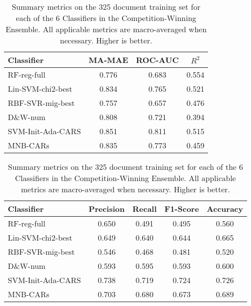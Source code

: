 \begin{table}[]
\centering
    \begin{tabular}{|l|c|c|c|}
        \hline
        \textsf{ Classifier } & \textsf{ MA-MAE } & \textsf{ ROC-AUC } & \textsf{ $R^2$ } \\
        \hline
      \cellcolor{gray!15} \textsf{ RF-reg-full } & 0.776 & 0.683 & \cellcolor{gray!15} 0.554 \\ 
       \cellcolor{gray!15} \textsf{ Lin-SVM-chi2-best } & 0.834 & 0.765 & 0.521  \\ 
       \cellcolor{gray!15} \textsf{ RBF-SVR-mig-best } & 0.757 & 0.657 & 0.476 \\ 
       \cellcolor{gray!15} \textsf{ D\&W-num } & 0.808 & 0.721 & 0.394 \\ 
       \cellcolor{gray!15} \textsf{ SVM-Init-Ada-CARS } & \cellcolor{gray!15} 0.851 & \cellcolor{gray!15} 0.811 & 0.515 \\ 
       \cellcolor{gray!15} \textsf{ MNB-CARs } & 0.835 & 0.773 & 0.459  \\
        \hline
    \end{tabular}
    \caption{Summary metrics on the 325 document training set for each of the 6 Classifiers in the Competition-Winning Ensemble. All applicable metrics are macro-averaged when necessary. Higher is better.}
    \label{tab:BestEnsembleClassifiersMAMetrics1}
\end{table}
\begin{table}[]
\centering

    \begin{tabular}{|l|c|c|c|c|}
    \hline
    \textsf{ Classifier } & \textsf{ Precision } & \textsf{ Recall } & \textsf{ F1-Score } & \textsf{ Accuracy } \\ 
    \hline
    \cellcolor{gray!15} \textsf{ RF-reg-full } & 0.650 & 0.491 & 0.495 & 0.560 \\ 
   \cellcolor{gray!15} \textsf{ Lin-SVM-chi2-best } & 0.649 & 0.640 & 0.644 & 0.665 \\ 
   \cellcolor{gray!15} \textsf{ RBF-SVR-mig-best } & 0.546 & 0.468 & 0.481 & 0.520 \\ 
   \cellcolor{gray!15} \textsf{ D\&W-num } & 0.593 & 0.595 & 0.593 & 0.600 \\ 
   \cellcolor{gray!15} \textsf{ SVM-Init-Ada-CARS } & \cellcolor{gray!15} 0.738 & \cellcolor{gray!15} 0.719 & \cellcolor{gray!15} 0.724 & \cellcolor{gray!15} 0.726 \\ 
   \cellcolor{gray!15} \textsf{ MNB-CARs } & 0.703 & 0.680 & 0.673 & 0.689 \\
   \hline
    \end{tabular}
    \caption{Summary metrics on the 325 document training set for each of the 6 Classifiers in the Competition-Winning Ensemble. All applicable metrics are macro-averaged when necessary. Higher is better.}
    \label{tab:BestEnsembleClassifiersMAMetrics2}
\end{table}

